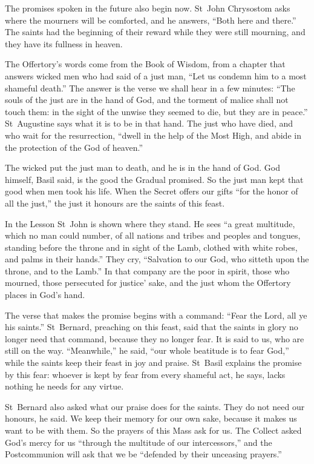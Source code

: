 The promises spoken in the future also begin now. St~John Chrysostom asks
where the mourners will be comforted, and he answers, ``Both here and
there.'' The saints had the beginning of their reward while they were still
mourning, and they have its fullness in heaven.

The Offertory's words come from the Book of Wisdom, from a chapter that
answers wicked men who had said of a just man, ``Let us condemn him to a most
shameful death.'' The answer is the verse we shall hear in a few minutes:
``The souls of the just are in the hand of God, and the torment of malice
shall not touch them: in the sight of the unwise they seemed to die, but they
are in peace.'' St~Augustine says what it is to be in that hand. The just who
have died, and who wait for the resurrection, ``dwell in the help of the Most
High, and abide in the protection of the God of heaven.''

The wicked put the just man to death, and he is in the hand of God. God
himself, Basil said, is the good the Gradual promised. So the just man kept
that good when men took his life. When the Secret offers our gifts ``for the
honor of all the just,'' the just it honours are the saints of this feast.

In the Lesson St~John is shown where they stand. He sees ``a great multitude,
which no man could number, of all nations and tribes and peoples and tongues,
standing before the throne and in sight of the Lamb, clothed with white robes,
and palms in their hands.'' They cry, ``Salvation to our God, who sitteth upon
the throne, and to the Lamb.'' In that company are the poor in spirit, those
who mourned, those persecuted for justice' sake, and the just whom the
Offertory places in God's hand.

The verse that makes the promise begins with a command: ``Fear the Lord, all
ye his saints.'' St~Bernard, preaching on this feast, said that the saints in
glory no longer need that command, because they no longer fear. It is said to
us, who are still on the way. ``Meanwhile,'' he said, ``our whole beatitude is
to fear God,'' while the saints keep their feast in joy and praise. St~Basil
explains the promise by this fear: whoever is kept by fear from every
shameful act, he says, lacks nothing he needs for any virtue.

St~Bernard also asked what our praise does for the saints. They do not need
our honours, he said. We keep their memory for our own sake, because it
makes us want to be with them. So the prayers of this Mass ask for us. The
Collect asked God's mercy for us ``through the multitude of our
intercessors,'' and the Postcommunion will ask that we be ``defended by their
unceasing prayers.''

